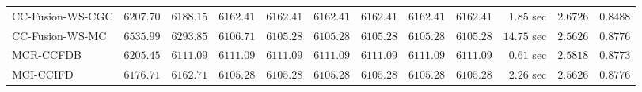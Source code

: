\begin{table}[H]
\begin{tabular}{lrrrrrrrrrrr}
    CC-Fusion-WS-CGC & $      6207.70$ & $      6188.15$ & $      6162.41$ & $      6162.41$ & $      6162.41$ & $      6162.41$ & $      6162.41$ & $      6162.41$ & $         1.85$ sec    & $       2.6726$  & $       0.8488$ \\ 
     CC-Fusion-WS-MC & $      6535.99$ & $      6293.85$ & $      6106.71$ & $      6105.28$ & $      6105.28$ & $      6105.28$ & $      6105.28$ & $      6105.28$ & $        14.75$ sec    & $       2.5626$  & $       0.8776$ \\ 
\cmidrule{1-1} 
           MCR-CCFDB & $      6205.45$ & $      6111.09$ & $      6111.09$ & $      6111.09$ & $      6111.09$ & $      6111.09$ & $      6111.09$ & $      6111.09$ & $         0.61$ sec    & $       2.5818$  & $       0.8773$ \\ 
\cmidrule{1-1} 
           MCI-CCIFD & $      6176.71$ & $      6162.71$ & $      6105.28$ & $      6105.28$ & $      6105.28$ & $      6105.28$ & $      6105.28$ & $      6105.28$ & $         2.26$ sec    & $       2.5626$  & $       0.8776$ \\ 
\bottomrule
\end{tabular}
\end{table}

